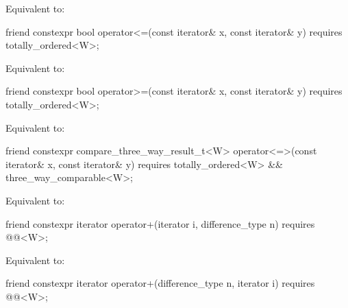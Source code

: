 \begin{itemdescr}
\pnum
\effects
Equivalent to: 
\end{itemdescr}

\begin{itemdecl}
friend constexpr bool operator<=(const iterator& x, const iterator& y)
  requires totally_ordered<W>;
\end{itemdecl}

\begin{itemdescr}
\pnum
\effects
Equivalent to: 
\end{itemdescr}

\begin{itemdecl}
friend constexpr bool operator>=(const iterator& x, const iterator& y)
  requires totally_ordered<W>;
\end{itemdecl}

\begin{itemdescr}
\pnum
\effects
Equivalent to: 
\end{itemdescr}

\begin{itemdecl}
friend constexpr compare_three_way_result_t<W>
  operator<=>(const iterator& x, const iterator& y)
    requires totally_ordered<W> && three_way_comparable<W>;
\end{itemdecl}

\begin{itemdescr}
\pnum
\effects
Equivalent to: 
\end{itemdescr}

\begin{itemdecl}
friend constexpr iterator operator+(iterator i, difference_type n)
  requires @@<W>;
\end{itemdecl}

\begin{itemdescr}
\pnum
\effects
Equivalent to: 
\end{itemdescr}

\begin{itemdecl}
friend constexpr iterator operator+(difference_type n, iterator i)
  requires @@<W>;
\end{itemdecl}

